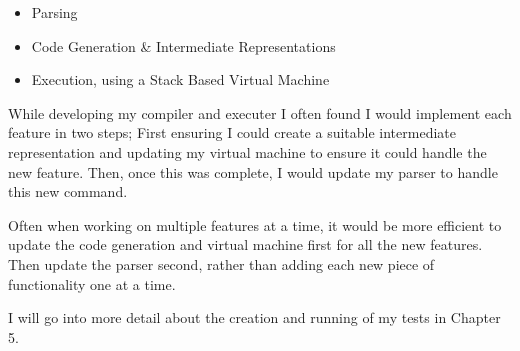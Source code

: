 \begin{itemize}
	\item Parsing
	\item Code Generation \& Intermediate Representations 
	\item Execution, using a Stack Based Virtual Machine
\end{itemize}

While developing my compiler and executer I often found I would implement each feature in two steps; First ensuring I could create a suitable intermediate representation and updating my virtual machine to ensure it could handle the new feature. Then, once this was complete, I would update my parser to handle this new command. 

Often when working on multiple features at a time, it would be more efficient to update the code generation and virtual machine first for all the new features. Then update the parser second, rather than adding each new piece of functionality one at a time. 

I will go into more detail about the creation and running of my tests in Chapter 5. 
   
